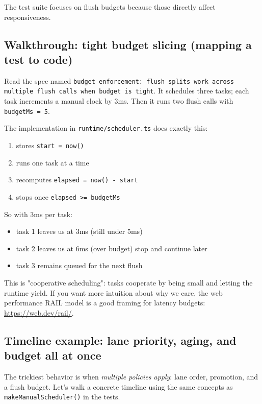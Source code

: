 The test suite focuses on flush budgets because those directly affect responsiveness.

\subsection{Walkthrough: tight budget slicing (mapping a test to code)}

Read the spec named \texttt{budget enforcement: flush splits work across multiple flush calls when budget is tight}.
It schedules three tasks; each task increments a manual clock by 3ms.
Then it runs two flush calls with \texttt{budgetMs = 5}.

The implementation in \texttt{runtime/scheduler.ts} does exactly this:

\begin{enumerate}
  \item stores \texttt{start = now()}
  \item runs one task at a time
  \item recomputes \texttt{elapsed = now() - start}
  \item stops once \texttt{elapsed >= budgetMs}
\end{enumerate}

So with 3ms per task:

\begin{itemize}
  \item task 1 leaves us at 3ms (still under 5ms)
  \item task 2 leaves us at 6ms (over budget) \textrightarrow stop and continue later
  \item task 3 remains queued for the next flush
\end{itemize}

This is "cooperative scheduling": tasks cooperate by being small and letting the runtime yield.
If you want more intuition about why we care, the web performance RAIL model is a good framing for latency budgets:
\href{https://web.dev/rail/}{https://web.dev/rail/}.

\subsection{Timeline example: lane priority, aging, and budget all at once}

The trickiest behavior is when \emph{multiple policies apply}: lane order, promotion, and a flush budget.
Let's walk a concrete timeline using the same concepts as \texttt{makeManualScheduler()} in the tests.

